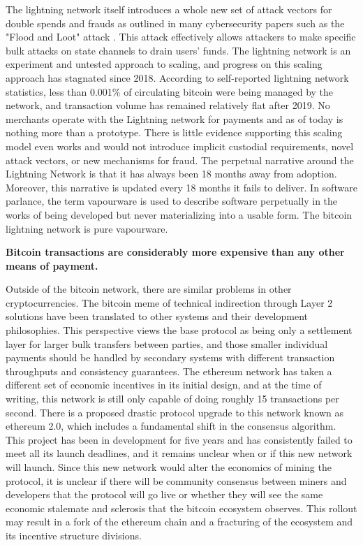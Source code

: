 
The lightning network itself introduces a whole new set of attack vectors for
double spends and frauds as outlined in many cybersecurity papers such as the
"Flood and Loot" attack \cite{harris2020flood}. This attack effectively allows
attackers to make specific bulk attacks on state channels to drain users' funds.
The lightning network is an experiment and untested approach to scaling, and
progress on this scaling approach has stagnated since 2018. According to
self-reported lightning network statistics, less than 0.001\% of circulating
bitcoin were being managed by the network, and transaction volume has remained
relatively flat after 2019. No merchants operate with the Lightning network for
payments and as of today is nothing more than a prototype. There is little
evidence supporting this scaling model even works and would not introduce
implicit custodial requirements, novel attack vectors, or new mechanisms for
fraud. The perpetual narrative around the Lightning Network is that it has
always been 18 months away from adoption. Moreover, this narrative is updated
every 18 months it fails to deliver. In software parlance, the term vapourware
is used to describe software perpetually in the works of being developed but
never materializing into a usable form. The bitcoin lightning network is pure
vapourware.

\begin{infobox}
 \textbf{Bitcoin transactions are considerably more expensive than any other means of payment.}
\end{infobox}

Outside of the bitcoin network, there are similar problems in other
cryptocurrencies. The bitcoin meme of technical indirection through Layer 2
solutions have been translated to other systems and their development
philosophies. This perspective views the base protocol as being only a
settlement layer for larger bulk transfers between parties, and those smaller
individual payments should be handled by secondary systems with different
transaction throughputs and consistency guarantees. The ethereum network has
taken a different set of economic incentives in its initial design, and at the
time of writing, this network is still only capable of doing roughly 15
transactions per second. There is a proposed drastic protocol upgrade to this
network known as ethereum 2.0, which includes a fundamental shift in the
consensus algorithm. This project has been in development for five years and has
consistently failed to meet all its launch deadlines, and it remains unclear
when or if this new network will launch. Since this new network would alter the
economics of mining the protocol, it is unclear if there will be community
consensus between miners and developers that the protocol will go live or
whether they will see the same economic stalemate and sclerosis that the bitcoin
ecosystem observes. This rollout may result in a fork of the ethereum chain and
a fracturing of the ecosystem and its incentive structure divisions.

